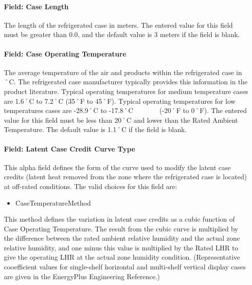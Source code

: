 \paragraph{Field: Case Length}\label{field-case-length}

The length of the refrigerated case in meters. The entered value for this field must be greater than 0.0, and the default value is 3 meters if the field is blank.

\paragraph{Field: Case Operating Temperature}\label{field-case-operating-temperature}

The average temperature of the air and products within the refrigerated case in ˚C. The refrigerated case manufacturer typically provides this information in the product literature. Typical operating temperatures for medium temperature cases are 1.6˚C to 7.2˚C (35˚F to 45˚F). Typical operating temperatures for low temperatures cases are -28.9˚C to -17.8˚C~~~~~~~ (-20˚F to 0˚F). The entered value for this field must be less than 20˚C and lower than the Rated Ambient Temperature. The default value is 1.1˚C if the field is blank.

\paragraph{Field: Latent Case Credit Curve Type}\label{field-latent-case-credit-curve-type}

This alpha field defines the form of the curve used to modify the latent case credits (latent heat removed from the zone where the refrigerated case is located) at off-rated conditions. The valid choices for this field are:

\begin{itemize}
\tightlist
\item
  CaseTemperatureMethod
\end{itemize}

This method defines the variation in latent case credits as a cubic function of Case Operating Temperature. The result from the cubic curve is multiplied by the difference between the rated ambient relative humidity and the actual zone relative humidity, and one minus this value is multiplied by the Rated LHR to give the operating LHR at the actual zone humidity condition. (Representative cooefficient values for single-shelf horizontal and multi-shelf vertical display cases are given in the EnergyPlus Engineering Reference.)

